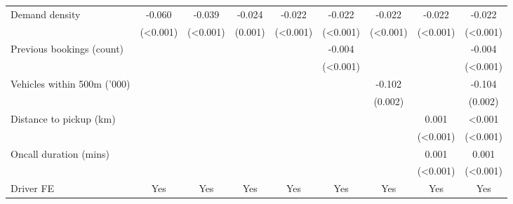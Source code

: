 \documentclass[reviewmode]{restud}
\begin{document}
\begin{landscape}
\begin{table}
{\begin{tabular}{l*{8}{S}}
            \addlinespace
            Demand density      &      -0.060&      -0.039&      -0.024&      -0.022&      -0.022&      -0.022&      -0.022&      -0.022\\
                                &     (<0.001)         &     (<0.001)         &     (0.001)         &     (<0.001)         &     (<0.001)         &     (<0.001)         &     (<0.001)         &     (<0.001)         \\
            \addlinespace
            Previous bookings (count)&                     &                     &                     &                     &      -0.004&                     &                     &      -0.004\\
                                &                     &                     &                     &                     &     (<0.001)         &                     &                     &     (<0.001)         \\
            \addlinespace
            Vehicles within 500m ('000)&                     &                     &                     &                     &                     &      -0.102&                     &      -0.104\\
                                &                     &                     &                     &                     &                     &     (0.002)         &                     &     (0.002)         \\
            \addlinespace
            Distance to pickup (km)&                     &                     &                     &                     &                     &                     &       0.001&       <0.001         \\
                                &                     &                     &                     &                     &                     &                     &     (<0.001)         &     (<0.001)         \\
            \addlinespace
            Oncall duration (mins)&                     &                     &                     &                     &                     &                     &       0.001&       0.001\\
                                &                     &                     &                     &                     &                     &                     &     (<0.001)         &     (<0.001)         \\
            \addlinespace
            Driver FE           &       {Yes}         &       {Yes}         &       {Yes}         &       {Yes}         &       {Yes}         &       {Yes}         &       {Yes}         &       {Yes}         \\

\end{tabular}}
\end{table}
\end{landscape}
\end{document}
